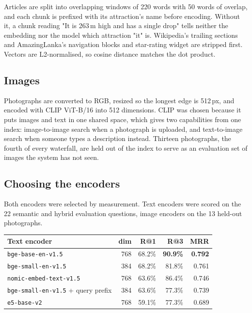 \documentclass[11pt,a4paper]{article}
\newcommand{\code}[1]{\texttt{\small #1}}
\begin{document}
Articles are split into overlapping windows of 220 words with 50 words of
overlap, and each chunk is prefixed with its attraction's name before
encoding. Without it, a chunk reading "It is 263\,m high and has a single
drop" tells neither the embedding nor the model which attraction "it" is.
Wikipedia's trailing sections and AmazingLanka's navigation blocks and
star-rating widget are stripped first. Vectors are L2-normalised, so cosine
distance matches the dot product.

\subsection{Images}

Photographs are converted to RGB, resized so the longest edge is 512\,px, and
encoded with CLIP ViT-B/16 into 512 dimensions. CLIP was chosen because it
puts images and text in one shared space, which gives two capabilities from
one index: image-to-image search when a photograph is uploaded, and
text-to-image search when someone types a description instead. Thirteen
photographs, the fourth of every waterfall, are held out of the index to
serve as an evaluation set of images the system has not seen.

\subsection{Choosing the encoders}

Both encoders were selected by measurement. Text encoders were scored on the
22 semantic and hybrid evaluation questions, image encoders on the 13
held-out photographs.

\begin{center}
\small
\begin{tabular}{@{}lrrrr@{}}
\toprule
\textbf{Text encoder} & \textbf{dim} & \textbf{R@1} & \textbf{R@3} & \textbf{MRR} \\
\midrule
\code{bge-base-en-v1.5}          & 768 & 68.2\% & \textbf{90.9\%} & \textbf{0.792} \\
\code{bge-small-en-v1.5}         & 384 & 68.2\% & 81.8\% & 0.761 \\
\code{nomic-embed-text-v1.5}     & 768 & 63.6\% & 86.4\% & 0.746 \\
\code{bge-small-en-v1.5} + query prefix & 384 & 63.6\% & 77.3\% & 0.739 \\
\code{e5-base-v2}                & 768 & 59.1\% & 77.3\% & 0.689 \\
\bottomrule
\end{tabular}
\end{center}
\end{document}
